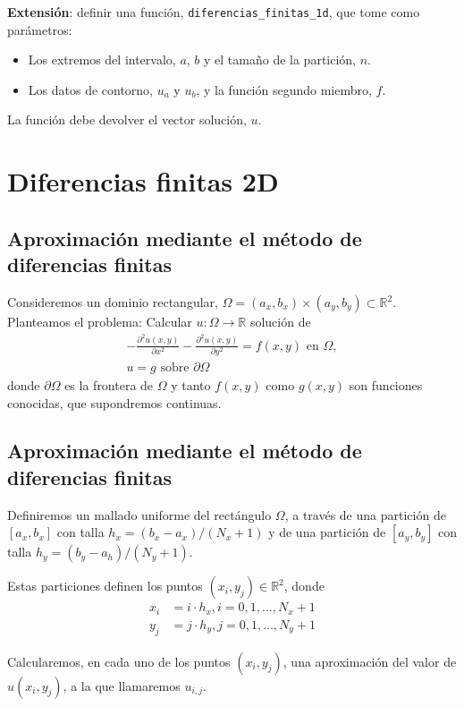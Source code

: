 \documentclass[11pt,spanish]{article}
\def\Rset{\mathbb{R}}
\newcommand{\en}{\mbox{\ en \ }}
\newcommand{\sobre}{\mbox{\ sobre \ }}
\begin{document}
\textbf{Extensión}: definir una función, \verb|diferencias_finitas_1d|,
que tome como parámetros:
\begin{itemize}
\item Los extremos del intervalo, $a$, $b$ y el tamaño de la
  partición, $n$.
\item Los datos de contorno, $u_a$ y $u_b$, y la función segundo
  miembro, $f$.
\end{itemize}
La función debe devolver el vector solución, $u$.

\section{Diferencias finitas 2D}

\subsection{Aproximación mediante el método de diferencias finitas}
\label{sec:diferencias-finitas-dim-2}

Consideremos un dominio rectangular, $\Omega=(a_x,b_x)\times(a_y,b_y)
\subset \Rset^2$.
Planteamos el problema: Calcular $u:\Omega \to  \Rset$ solución de
\begin{align}
  \label{pb1d}
  -\frac{\partial^2 u(x,y) }{\partial x^2}
  -\frac{\partial^2 u(x,y) }{\partial y^2}
  = f(x,y) \en \Omega, \\
  u=g \sobre \partial\Omega
\end{align}
donde $\partial\Omega$ es la frontera de $\Omega$ y tanto $f(x,y)$
como $g(x,y)$ son funciones conocidas, que supondremos continuas.


\subsection{Aproximación mediante el método de diferencias finitas}
\label{sec:diferencias-finitas-dim-2}

Definiremos un mallado uniforme del rectángulo $\Omega$, a través de
una partición de $[a_x,b_x]$ con talla $h_x = (b_x-a_x)/(N_x+1)$ y de
una partición de $[a_y,b_y]$ con talla $h_y = (b_y-a_h)/(N_y+1)$.

Estas particiones definen los puntos $(x_i,y_j)\in\Rset^2$, donde
\begin{align*}
  x_i &= i\cdot h_x, i=0,1,...,N_x+1
  \\
  y_j &= j\cdot h_y, j=0,1,...,N_y+1
\end{align*}

Calcularemos, en cada uno de los puntos $(x_i,y_j)$, una aproximación del
valor de $u(x_i,y_j)$, a la que llamaremos $u_{i,j}$.
\end{document}
